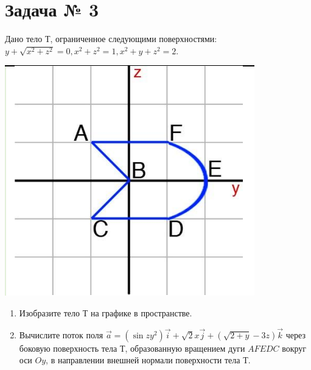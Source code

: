 \section{Задача № 3}

Дано тело Т, ограниченное следующими поверхностями: $y+\sqrt{x^2+z^2}=0, x^2+z^2=1, x^2+y+z^2=2$.

\includegraphics[scale=0.5]{images/Input_task3.png}

\begin{enumerate}
    \item Изобразите тело Т на графике в пространстве.
    \item Вычислите поток поля $\Vec{a} = ( \sin{zy^2})\Vec{i} + \sqrt{2}x\Vec{j} + (\sqrt{2+y}-3z)\Vec{k}$ через боковую поверхность тела Т, образованную вращением дуги $AFEDC$ вокруг оси $Oy$, в направлении внешней нормали поверхности тела Т.
\end{enumerate}

